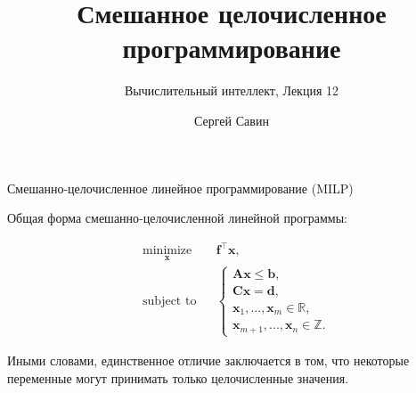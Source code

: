 \documentclass{beamer}
\title{Смешанное целочисленное программирование}
\subtitle{Вычислительный интеллект, Лекция  12}
\author{Сергей Савин}
\date{\mydate}
\begin{document}
	\maketitle
	
	
	
	
	\begin{frame}{Смешанно-целочисленное линейное программирование (MILP)}
		\begin{flushleft}
			
			Общая форма смешанно-целочисленной линейной программы:
			
			\begin{equation} \label{LP}
				\begin{aligned}
					& \underset{\mathbf{x}}{\text{minimize}}
					& & \mathbf{f}^\top \mathbf{x}, \\
					& \text{subject to}
					& & \begin{cases} 
						\mathbf{A} \mathbf{x}
						\leq 
						\mathbf{b}, \\ 
						\mathbf{C}\mathbf{x} = 
						\mathbf{d},  \\
						\mathbf{x}_1, ..., \mathbf{x}_m \in \mathbb{R},\\
						\mathbf{x}_{m+1}, ..., \mathbf{x}_n \in \mathbb{Z}.
					\end{cases}
				\end{aligned}
			\end{equation}
			
			Иными словами, единственное отличие заключается в том, что некоторые переменные могут принимать только целочисленные значения.
			
		\end{flushleft}
	\end{frame}
	
	
	
\end{document}
